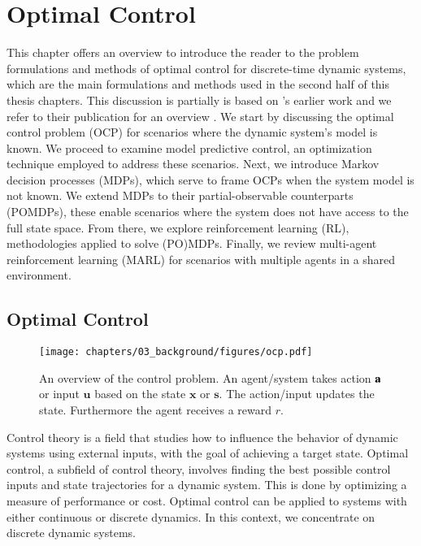 \section{Optimal Control}
\label{sec:ocp}

This chapter offers an overview to introduce the reader to the problem formulations and methods of optimal control for discrete-time dynamic systems, which are the main formulations and methods used in the second half of this thesis chapters. This discussion is partially is based on \citeauthor{gebhardt2020optimal}'s earlier work and we refer to their publication for an overview \cite{gebhardt2020optimal}. 
% 
We start by discussing the optimal control problem (OCP) for scenarios where the dynamic system's model is known. We proceed to examine model predictive control, an optimization technique employed to address these scenarios. Next, we introduce Markov decision processes (MDPs), which serve to frame OCPs when the system model is not known. We extend MDPs to their partial-observable counterparts (POMDPs), these enable scenarios where the system does not have access to the full state space. From there, we explore reinforcement learning (RL), methodologies applied to solve (PO)MDPs. Finally, we review multi-agent reinforcement learning (MARL) for scenarios with multiple agents in a shared environment. 

\subsection{Optimal Control}

\begin{figure}
    \centering
    \texttt{[image: chapters/03\_background/figures/ocp.pdf]}
    \caption{An overview of the control problem. An agent/system takes action $\mathbf{a}$ or input $\mathbf{u}$ based on the state $\mathbf{x}$ or $\mathbf{s}$. The action/input updates the state. Furthermore the agent receives a reward $r$.}
    \label{fig:ocp}
\end{figure}


 Control theory is a field that studies how to influence the behavior of dynamic systems using external inputs, with the goal of achieving a target state. Optimal control, a subfield of control theory, involves finding the best possible control inputs and state trajectories for a dynamic system. This is done by optimizing a measure of performance or cost. Optimal control can be applied to systems with either continuous or discrete dynamics. In this context, we concentrate on discrete dynamic systems.

